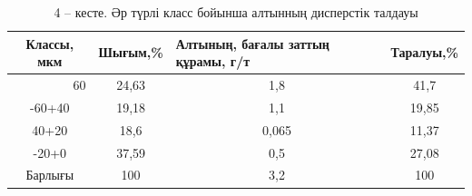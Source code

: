 

\begin{table}[H]
\caption*{4 -- кесте. Әр түрлі класс бойынша алтынның дисперстік талдауы}
\centering
\begin{tabular}{|c|c|c|c|}
\hline
Классы, мкм & \multicolumn{1}{l|}{Шығым,\%} & \multicolumn{1}{l|}{Алтының, бағалы заттың құрамы, г/т} & \multicolumn{1}{l|}{Таралуы,\%} \\ \hline
\multicolumn{1}{|r|}{60} & 24,63 & 1,8   & 41,7  \\ \hline
-60+40                   & 19,18 & 1,1   & 19,85 \\ \hline
40+20                    & 18,6  & 0,065 & 11,37 \\ \hline
-20+0                    & 37,59 & 0,5   & 27,08 \\ \hline
Барлығы                  & 100   & 3,2   & 100   \\ \hline
\end{tabular}%
\end{table}


